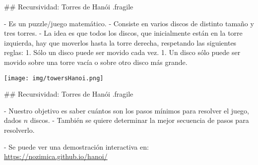 ## Recursividad: Torres de Hanói {.fragile}

- Es un puzzle/juego matemático.
- Consiste en varios discos de distinto tamaño y tres torres.
- La idea es que todos los discos, que inicialmente están en la torre
izquierda, hay que moverlos hasta la torre derecha, respetando las siguientes reglas:
    1. Sólo un disco puede ser movido cada vez.
    1. Un disco sólo puede ser movido sobre una torre vacía o sobre otro disco más grande.

\centering    \texttt{[image: img/towersHanoi.png]}

## Recursividad: Torres de Hanói {.fragile}

- Nuestro objetivo es saber cuántos son los pasos mínimos para resolver el juego, dados
$n$ discos.
- También se quiere determinar la mejor secuencia de pasos para resolverlo.

- Se puede ver una demostración interactiva en: \url{https://nozimica.github.io/hanoi/}

